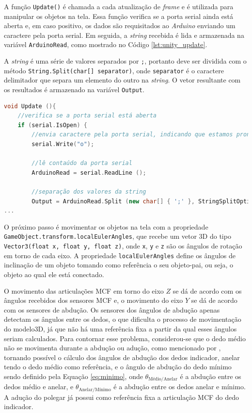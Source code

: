 A função \lstinline!Update()! é chamada a cada atualização de \textit{frame} e é utilizada para manipular os objetos na tela. Essa função verifica se a porta serial ainda está aberta e, em caso positivo, os dados são requisitados ao \textit{Arduino} enviando um caractere pela porta serial. Em seguida, a \textit{string} recebida é lida e armazenada na variável \lstinline!ArduinoRead!, como mostrado no Código \ref{lst:unity_update}.

A \textit{string} é uma série de valores separados por \lstinline!;!, portanto deve ser dividida com o método \lstinline!String.Split(char[] separator)!, onde \lstinline!separator! é o caractere delimitador que separa um elemento do outro na \textit{string}. O vetor resultante com os resultados é armazenado na variável \lstinline!Output!.

\begin{lstlisting}[language=C++,label=lst:unity_update,caption={Função Update()},morekeywords={SerialPort,IsOpen,Close,Open,Quaternion,GameObject,Vector3,Split,transform,localEulerAngles,Parse,Set,eulerAngles}]
void Update (){
	//verifica se a porta serial está aberta
	if (serial.IsOpen) {
		//envia caractere pela porta serial, indicando que estamos prontos para atualizar as posições
		serial.Write("o");
		
		//lê contaúdo da porta serial
		ArduinoRead = serial.ReadLine ();
		
		//separação dos valores da string
		Output = ArduinoRead.Split (new char[] { ';' }, StringSplitOptions.RemoveEmptyEntries);
...
\end{lstlisting}

O próximo passo é movimentar os objetos na tela com a propriedade \lstinline!GameObject.transform.localEulerAngles!, que recebe um vetor \ac{3D} do tipo \lstinline!Vector3(float x, float y, float z)!, onde \lstinline!x!, \lstinline!y! e \lstinline!z! são os ângulos de rotação em torno de cada eixo. A propriedade \lstinline!localEulerAngles! define os ângulos de inclinação de um objeto tomando como referência o seu objeto-pai, ou seja, o objeto ao qual ele está conectado.

O movimento das articulações \ac{MCF} em torno do eixo $Z$ se dá de acordo com os ângulos recebidos dos sensores \ac{MCF} e, o movimento do eixo $Y$ se dá de acordo com os sensores de abdução. Os sensores dos ângulos de abdução apenas detectam os ângulos entre os dedos, o que dificulta o processo de movimentação do modelo\ac{3D}, já que não há uma referência fixa a partir da qual esses ângulos seriam calculados. Para contornar esse problema, considerou-se que o dedo médio não se movimenta durante a abdução ou adução, como mencionado por , tornando possível o cálculo dos ângulos de abdução dos dedos indicador, anelar tendo o dedo médio como referência, e o ângulo de abdução do dedo mínimo sendo definido pela Equação \ref{eq:minimo}, onde $\theta_{\text{Médio/Anelar}}$ é a abdução entre os dedos médio e anelar, e $\theta_{\text{Anelar/Mínimo}}$ é a abdução entre os dedos anelar e mínimo. A adução do polegar já possui como referência fixa a articulação \ac{MCF} do dedo indicador.

